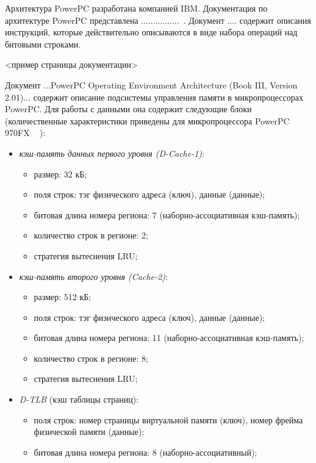 \documentclass[14pt]{extreport}
\newcommand{\LRU}{\textsf{LRU}\xspace}
\begin{document}
Архитектура PowerPC разработана компанией IBM. Документация по архитектуре PowerPC представлена ................~\cite{??????????}. Документ
.... содержит описания инструкций, которые действительно описываются в виде набора
операций над битовыми строками.

<пример страницы документации>

Документ ...PowerPC Operating Environment Architecture (Book III, Version 2.01)... содержит описание подсистемы управления памяти в микропроцессорах PowerPC. Для работы с данными она содержит следующие блоки (количественные
характеристики приведены для микропроцессора PowerPC 970FX
~\cite{PowerPC970FXUserManual}%
):
\begin{itemize}
  \item \emph{кэш-память данных первого уровня (D-Cache-1)}:
        \begin{itemize}
            \item размер: 32 кБ;
            \item поля строк: тэг физического адреса (ключ), данные (данные);
            \item битовая длина номера региона: 7 (наборно-ассоциативная кэш-память);
            \item количество строк в регионе: 2;
            \item стратегия вытеснения \LRU;
        \end{itemize}
  \item \emph{кэш-память второго уровня (Cache-2)}:
        \begin{itemize}
            \item размер: 512 кБ;
            \item поля строк: тэг физического адреса (ключ), данные (данные);
            \item битовая длина номера региона: 11 (наборно-ассоциативная кэш-память);
            \item количество строк в регионе: 8;
            \item стратегия вытеснения \LRU;
        \end{itemize}
  \item \emph{D-TLB} (кэш таблицы страниц):
        \begin{itemize}
            \item поля строк: номер страницы виртуальной памяти (ключ), номер фрейма физической памяти (данные);
            \item битовая длина номера региона: 8 (наборно-ассоциативный);

\end{itemize}
\end{itemize}
\end{document}
